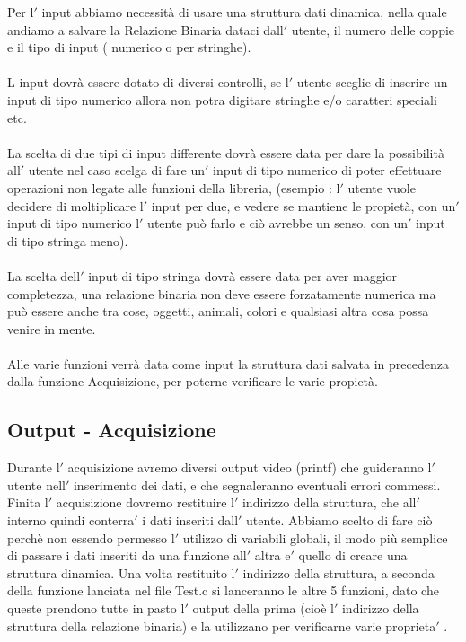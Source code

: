 \documentclass[11pt, a4paper, titlepage, block]{article}
\begin{document}
	
	Per l$'$ input abbiamo necessit\`a di usare una struttura dati dinamica, nella quale andiamo a salvare la Relazione Binaria dataci dall$'$ utente, il numero delle coppie e il tipo di input ( numerico o per stringhe).\\
	\\
	L input dovr\`a essere dotato di diversi controlli, se l$'$ utente sceglie di inserire un input di tipo numerico allora non potra digitare stringhe e/o caratteri speciali etc.\\
	\\
	La scelta di due tipi di input differente dovr\`a essere data per dare la possibilit\`a all$'$ utente nel caso scelga di fare un$'$ input di tipo numerico di poter effettuare operazioni non legate alle funzioni della libreria, (esempio : l$'$ utente vuole decidere di moltiplicare l$'$ input per due, e vedere se mantiene le propiet\`a, con un$'$ input di tipo numerico l$'$ utente può farlo e ciò avrebbe un senso, con un$'$ input di tipo stringa meno).\\
	\\
	La scelta dell$'$ input di tipo stringa dovr\`a essere data per aver maggior completezza, una relazione binaria non deve essere forzatamente numerica ma può essere anche tra cose, oggetti, animali, colori e qualsiasi altra cosa possa venire in mente.\\
	\\
	Alle varie funzioni verr\`a data come input la struttura dati salvata in precedenza dalla funzione Acquisizione, per poterne verificare le varie propiet\`a.\\
	
	
	
	
	\newpage        
	\subsection{Output - Acquisizione}
	Durante l$'$ acquisizione avremo diversi output video (printf) che guideranno l$'$ utente nell$'$ inserimento dei dati, e che segnaleranno eventuali errori commessi.
	Finita l$'$ acquisizione dovremo restituire l$'$ indirizzo della struttura, che all$'$ interno quindi conterra$'$  i dati inseriti dall$'$ utente. Abbiamo scelto di fare ciò perch\`e non essendo permesso l$'$ utilizzo di variabili globali, il modo più semplice di passare i dati inseriti da una funzione all$'$ altra e$'$  quello di creare una struttura dinamica.
	Una volta restituito l$'$ indirizzo della struttura, a seconda della funzione lanciata nel file Test.c si lanceranno le altre 5 funzioni, dato che queste prendono tutte in pasto l$'$ output della prima (cio\`e l$'$ indirizzo della struttura della relazione binaria) e la utilizzano per verificarne varie proprieta$'$ .\\
	\\
\end{document}
